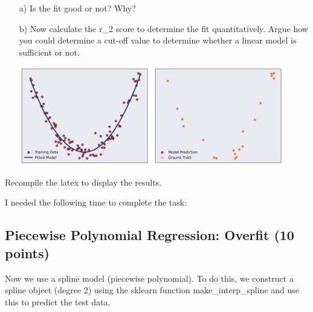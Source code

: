 \begin{enumerate}

\item[a)] Is the fit good or not? Why? 

\item[b)] Now calculate the r\_2 score to determine the fit quantitatively. Argue how you could determine a cut-off value to determine whether a linear model is sufficient or not.

\includegraphics[width=0.45\textwidth]{source_code/goodfit_polynomial_model.png}
\includegraphics[width=0.45\textwidth]{source_code/goodfit_polynomial_testdata.png}

\end{enumerate}

Recompile the latex to display the results.

I needed the following time to complete the task:

\subsection{Piecewise Polynomial Regression: Overfit (10 points)}

Now we use a spline model (piecewise polynomial). To do this, we construct a spline object (degree 2) using the sklearn function make\_interp\_spline and use this to predict the test data.

